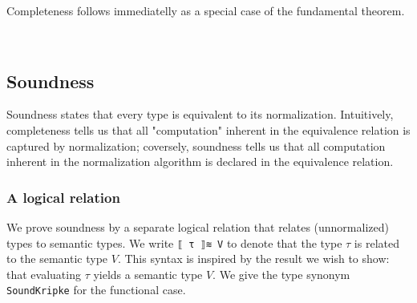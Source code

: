 \documentclass[authoryear, acmsmall, screen, review, nonacm]{acmart}
\begin{document}
Completeness follows immediatelly as a special case of the fundamental theorem.

\begin{code}%
\>[0]\AgdaSpace{}%
\AgdaSymbol{:}\AgdaSpace{}%
\AgdaSpace{}%
\AgdaSymbol{\{}\AgdaSpace{}%
\AgdaSpace{}%
\AgdaSymbol{:}\AgdaSpace{}%
\AgdaSpace{}%
\AgdaSpace{}%
\AgdaSymbol{\}}\AgdaSpace{}%
\AgdaSpace{}%
\AgdaSpace{}%
\AgdaSpace{}%
\AgdaSpace{}%
\AgdaSpace{}%
\AgdaSpace{}%
\AgdaSpace{}%
\AgdaSpace{}%
\AgdaSpace{}%
\<%
\\
\>[0]\AgdaSpace{}%
\AgdaSpace{}%
\AgdaSymbol{=}\AgdaSpace{}%
\AgdaSpace{}%
\AgdaSymbol{(}\AgdaSpace{}%
\AgdaSpace{}%
\AgdaSymbol{)}\<%
\end{code}


\subsection{Soundness}

Soundness states that every type is equivalent to its normalization. Intuitively, completeness tells us that all "computation" inherent in the equivalence relation is captured by normalization; coversely, soundness tells us that all computation inherent in the normalization algorithm is declared in the equivalence relation.

\subsubsection{A logical relation}

We prove soundness by a separate logical relation that relates (unnormalized) types to semantic types. We write \verb!⟦ τ ⟧≋ V! to denote that the type $\tau$ is related to the semantic type $V$. This syntax is inspired by the result we wish to show: that evaluating $\tau$ yields a semantic type $V$. We give the type synonym \verb!SoundKripke! for the functional case.
\end{document}
